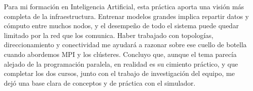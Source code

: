 Para mi formación en Inteligencia Artificial, esta práctica aporta una visión más completa de la infraestructura. Entrenar modelos grandes implica repartir datos y cómputo entre muchos nodos, y el desempeño de todo el sistema puede quedar limitado por la red que los comunica. Haber trabajado con topologías, direccionamiento y conectividad me ayudará a razonar sobre ese cuello de botella cuando abordemos MPI y los clústeres. Concluyo que, aunque el tema parecía alejado de la programación paralela, en realidad es su cimiento práctico, y que completar los dos cursos, junto con el trabajo de investigación del equipo, me dejó una base clara de conceptos y de práctica con el simulador.
